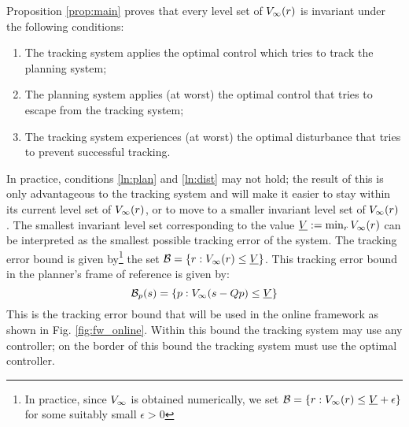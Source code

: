 Proposition \ref{prop:main} proves that every level set of $V_\infty(r)$ is invariant under the following conditions:
\begin{enumerate}
  \item The tracking system applies the optimal control which tries to track the planning system;
  \item The planning system applies (at worst) the optimal control that tries to escape from the tracking system; \label{ln:plan}
  \item The tracking system experiences (at worst) the optimal disturbance that tries to prevent successful tracking. \label{ln:dist}
\end{enumerate}
In practice, conditions \ref{ln:plan} and \ref{ln:dist} may not hold; the result of this is only advantageous to the tracking system and will make it easier to stay within its current level set of $V_\infty(r)$, or to move to a smaller invariant level set of $V_\infty(r)$. The smallest invariant level set corresponding to the value $\underline{V} := \min_{r} V_\infty(r)$ can be interpreted as the smallest possible tracking error of the system. The tracking error bound is given by\footnote{In practice, since $V_\infty$ is obtained numerically, we set $\mathcal B = \{r: V_\infty(r) \le \underline{V} + \epsilon\}$ for some suitably small $\epsilon>0$} the set $\mathcal B = \{r: V_\infty(r) \le \underline{V}\}$. This tracking error bound in the planner's frame of reference is given by:
\begin{equation} \label{eq:TEBp}
\mathcal B_p(s) = \{p: V_\infty(s-Qp) \le \underline{V}\}
\end{equation}
This is the tracking error bound that will be used in the online framework as shown in Fig. \ref{fig:fw_online}. Within this bound the tracking system may use any controller; on the border of this bound the tracking system must use the optimal controller. 

